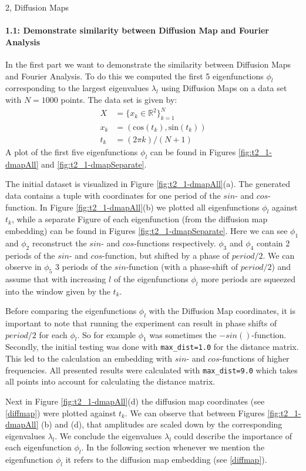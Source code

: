 \begin{task}{2, Diffusion Maps}
\paragraph{1.1: Demonstrate similarity between Diffusion Map and Fourier Analysis}
In the first part we want to demonstrate the similarity between Diffusion Maps and Fourier Analysis. To do this we computed the first 5 eigenfunctions $\phi_l$ corresponding to the largest eigenvalues $\lambda_l$ using Diffusion Maps on a data set with $N=1000$ points. The data set is given by:
\begin{align*}
    X &= \{ x_k\in\mathbb{R}^2\}^N_{k=1}\\
    x_k &= (\text{cos}(t_k), \text{sin}(t_k))\\
    t_k &=  (2\pi k)/(N+1)
\end{align*}
A plot of the first five eigenfunctions $\phi_l$ can be found in Figures \ref{fig:t2_1-dmapAll} and \ref{fig:t2_1-dmapSeparate}.

The initial dataset is visualized in Figure \ref{fig:t2_1-dmapAll}(a). The generated data contains a tuple with coordinates for one period of the $sin$- and $cos$-function. In Figure \ref{fig:t2_1-dmapAll}(b) we plotted all eigenfunctions $\phi_l$ against $t_k$, while a separate Figure of each eigenfunction (from the diffusion map embedding) can be found in Figures \ref{fig:t2_1-dmapSeparate}. Here we can see $\phi_1$ and $\phi_2$ reconstruct the $sin$- and $cos$-functions respectively. $\phi_3$ and $\phi_4$ contain 2 periods of the $sin$- and $cos$-function, but shifted by a phase of $period/2$. We can observe in $\phi_5$ 3 periods of the $sin$-function (with a phase-shift of $period/2$) and assume that with increasing $l$ of the eigenfunctions $\phi_l$ more periods are squeezed into the window given by the $t_k$.

Before comparing the eigenfunctions $\phi_l$ with the Diffusion Map coordinates, it is important to note that running the experiment can result in phase shifts of $period/2$ for each $\phi_l$. So for example $\phi_1$ was sometimes the $-sin()$-function. Secondly, the initial testing was done with \verb|max_dist=1.0| for the distance matrix. This led to the calculation an embedding with $sin$- and $cos$-functions of higher frequencies. All presented results were calculated with \verb|max_dist=9.0| which takes all points into account for calculating the distance matrix.

Next in Figure \ref{fig:t2_1-dmapAll}(d) the diffusion map coordinates (see \ref{diffmap}) were plotted against $t_k$. We can observe that between Figures \ref{fig:t2_1-dmapAll} (b) and (d), that amplitudes are scaled down by the corresponding eigenvalues $\lambda_l$. We conclude the eigenvalues $\lambda_l$ could describe the importance of each eigenfunction $\phi_l$. In the following section whenever we mention the eigenfunction $\phi_l$ it refers to the diffusion map embedding (see \ref{diffmap}).


\end{task}
